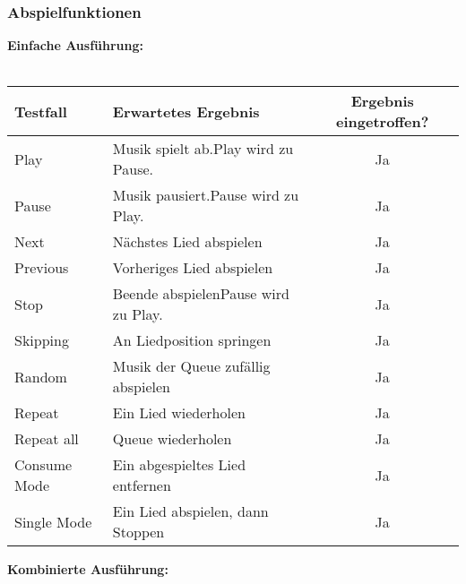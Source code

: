 \subsubsection{Abspielfunktionen}
\textbf{Einfache Ausführung:}\ \\ \\
\begin{tabular}[c]{|l|p{6cm}|c|}
\hline
\textbf{Testfall} & \textbf{Erwartetes Ergebnis} & \textbf{Ergebnis eingetroffen?}\\
\hline
Play & Musik spielt ab.\newline Play wird zu Pause. & Ja\\
\hline
Pause & Musik pausiert.\newline Pause wird zu Play. & Ja\\
\hline
Next & Nächstes Lied abspielen & Ja\\
\hline
Previous & Vorheriges Lied abspielen & Ja\\
\hline
Stop & Beende abspielen\newline Pause wird zu Play. & Ja\\
\hline
Skipping & An Liedposition springen & Ja\\
\hline
Random & Musik der Queue zufällig abspielen & Ja\\
\hline 
Repeat & Ein Lied wiederholen & Ja\\
\hline
Repeat all & Queue wiederholen & Ja\\
\hline
Consume Mode & Ein abgespieltes Lied entfernen & Ja\\
\hline
Single Mode & Ein Lied abspielen, dann Stoppen & Ja\\
\hline
\end{tabular}
\newpage
\textbf{Kombinierte Ausführung:}\ \\ \\
